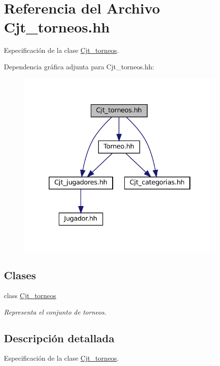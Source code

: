 \hypertarget{_cjt__torneos_8hh}{}\section{Referencia del Archivo Cjt\+\_\+torneos.\+hh}
\label{_cjt__torneos_8hh}


Especificación de la clase \hyperlink{class_cjt__torneos}{Cjt\+\_\+torneos}.  


Dependencia gráfica adjunta para Cjt\+\_\+torneos.\+hh\+:\nopagebreak
\begin{figure}[H]
\begin{center}
\leavevmode
\includegraphics[width=298pt]{_cjt__torneos_8hh__incl}
\end{center}
\end{figure}
\subsection*{Clases}
\begin{DoxyCompactItemize}
\item 
class \hyperlink{class_cjt__torneos}{Cjt\+\_\+torneos}
\begin{DoxyCompactList}\small\item\em Representa el conjunto de torneos. \end{DoxyCompactList}\end{DoxyCompactItemize}


\subsection{Descripción detallada}
Especificación de la clase \hyperlink{class_cjt__torneos}{Cjt\+\_\+torneos}. 

